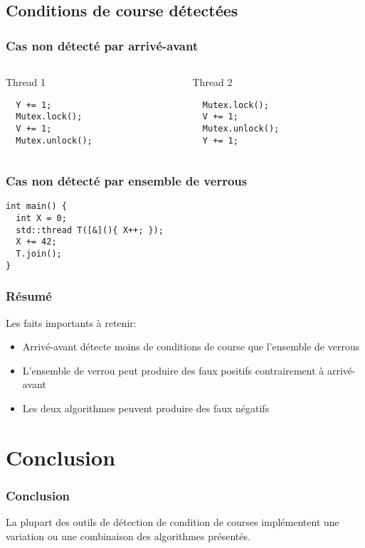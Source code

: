 \documentclass{beamer}
\begin{document}
\subsection{Conditions de course détectées}
\begin{frame}[fragile]
\frametitle{Cas non détecté par arrivé-avant}
\begin{columns}
    \begin{column}{0.5\textwidth}
    \begin{center}
Thread 1  
    \end{center}
    \begin{lstlisting}
  Y += 1;
  Mutex.lock();
  V += 1;
  Mutex.unlock();
\end{lstlisting}
    \end{column}
    \begin{column}{0.5\textwidth}
    \begin{center}
Thread 2    
    \end{center}
    \begin{lstlisting}
  Mutex.lock();
  V += 1;
  Mutex.unlock();
  Y += 1;
\end{lstlisting}
    \end{column}
\end{columns}
\end{frame}

\begin{frame}[fragile]
\frametitle{Cas non détecté par ensemble de verrous}
\begin{lstlisting}
int main() {
  int X = 0;
  std::thread T([&](){ X++; });
  X += 42;
  T.join();
}
\end{lstlisting}
\end{frame}

\begin{frame}
\frametitle{Résumé}
Les faits importants à retenir:
\begin{itemize}
\item Arrivé-avant détecte moins de conditions de course que l'ensemble de verrous
\item L'ensemble de verrou peut produire des faux positifs contrairement à arrivé-avant
\item Les deux algorithmes peuvent produire des faux négatifs
\end{itemize}
\end{frame}

\section{Conclusion}
\begin{frame}
\frametitle{Conclusion}
La plupart des outils de détection de condition de courses implémentent une variation ou une combinaison des algorithmes présentés.
\end{frame}
\end{document}
